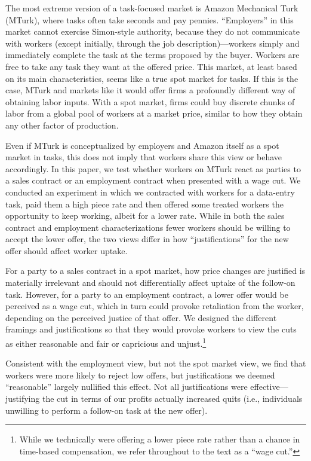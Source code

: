 \documentclass[11pt]{article}
\begin{document}
The most extreme version of a task-focused market is Amazon Mechanical Turk (MTurk), where tasks often take seconds and pay pennies.
``Employers'' in this market cannot exercise Simon-style authority, because they do not communicate with workers (except initially, through the job description)---workers simply and immediately complete the task at the terms proposed by the buyer.
Workers are free to take any task they want at the offered price. 
This market, at least based on its main characteristics, seems like a true spot market for tasks.
If this is the case, MTurk and markets like it would offer firms a profoundly different way of obtaining labor inputs. 
With a spot market, firms could buy discrete chunks of labor from a global pool of workers at a market price, similar to how they obtain any other factor of production.   

Even if MTurk is conceptualized by employers and Amazon itself as a spot market in tasks, this does not imply that workers share this view or behave accordingly. 
In this paper, we test whether workers on MTurk react as parties to a sales contract or an employment contract when presented with a wage cut. 
We conducted an experiment in which we contracted with workers for a data-entry task, paid them a high piece rate and then offered some treated workers the opportunity to keep working, albeit for a lower rate. 
While in both the sales contract and employment characterizations fewer workers should be willing to accept the lower offer, the two views differ in how ``justifications'' for the new offer should affect worker uptake.

For a party to a sales contract in a spot market, how price changes are justified is materially irrelevant and should not differentially affect uptake of the follow-on task.
However, for a party to an employment contract, a lower offer would be perceived as a wage cut, which in turn could provoke retaliation from the worker, depending on the perceived justice of that offer. 
We designed the different framings and justifications so that they would provoke workers to view the cuts as either reasonable and fair or capricious and unjust.\footnote{ 
  While we technically were offering a lower piece rate rather than a chance in time-based compensation, we refer throughout to the text as a ``wage cut.''
  }
 
Consistent with the employment view, but not the spot market view, we find that workers were more likely to reject low offers, but justifications we deemed ``reasonable'' largely nullified this effect. 
Not all justifications were effective---justifying the cut in terms of our profits actually increased quits (i.e., individuals unwilling to perform a follow-on task at the new offer). 
\end{document}
